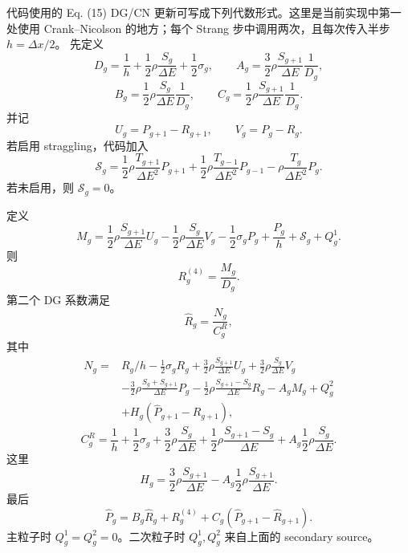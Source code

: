 \documentclass[11pt,a4paper]{ctexart}
\begin{document}
代码使用的 Eq. (15) DG/CN 更新可写成下列代数形式。这里是当前实现中第一处使用
Crank--Nicolson 的地方；每个 Strang 步中调用两次，且每次传入半步 \(h=\Delta x/2\)。
先定义
\begin{equation}
  D_g
  =
  \frac1h
  +\frac12\rho\frac{S_g}{\Delta E}
  +\frac12\sigma_g,
  \qquad
  A_g
  =
  \frac{3}{2}\rho\frac{S_{g+1}}{\Delta E}\frac{1}{D_g},
\end{equation}
\begin{equation}
  B_g
  =
  \frac12\rho\frac{S_g}{\Delta E}\frac{1}{D_g},
  \qquad
  C_g
  =
  \frac12\rho\frac{S_{g+1}}{\Delta E}\frac{1}{D_g}.
\end{equation}
并记
\begin{equation}
  U_g=P_{g+1}-R_{g+1},\qquad V_g=P_g-R_g.
\end{equation}
若启用 straggling，代码加入
\begin{equation}
  \mathcal S_g
  =
  \frac12\rho\frac{T_{g+1}}{\Delta E^2}P_{g+1}
  +
  \frac12\rho\frac{T_{g-1}}{\Delta E^2}P_{g-1}
  -
  \rho\frac{T_g}{\Delta E^2}P_g.
\end{equation}
若未启用，则 \(\mathcal S_g=0\)。

定义
\begin{equation}
  M_g
  =
  \frac12\rho\frac{S_{g+1}}{\Delta E}U_g
  -
  \frac12\rho\frac{S_g}{\Delta E}V_g
  -
  \frac12\sigma_g P_g
  +
  \frac{P_g}{h}
  +
  \mathcal S_g
  +
  Q_g^1.
\end{equation}
则
\begin{equation}
  R^{(4)}_g=\frac{M_g}{D_g}.
\end{equation}
第二个 DG 系数满足
\begin{equation}
  \widehat R_g=\frac{N_g}{C_g^{R}},
\end{equation}
其中
\begin{equation}
\begin{aligned}
  N_g={}&
    R_g/h-\frac12\sigma_gR_g
    +\frac32\rho\frac{S_{g+1}}{\Delta E}U_g
    +\frac32\rho\frac{S_g}{\Delta E}V_g \\
  &-\frac32\rho\frac{S_g+S_{g+1}}{\Delta E}P_g
    -\frac12\rho\frac{S_{g+1}-S_g}{\Delta E}R_g
    -A_gM_g+Q_g^2 \\
  &+H_g(\widehat P_{g+1}-\widehat R_{g+1}),
\end{aligned}
\end{equation}
\begin{equation}
  C_g^{R}
  =
  \frac1h+\frac12\sigma_g
  +\frac32\rho\frac{S_g}{\Delta E}
  +\frac12\rho\frac{S_{g+1}-S_g}{\Delta E}
  +A_g\frac12\rho\frac{S_g}{\Delta E}.
\end{equation}
这里
\begin{equation}
  H_g
  =
  \frac32\rho\frac{S_{g+1}}{\Delta E}
  -
  A_g\frac12\rho\frac{S_{g+1}}{\Delta E}.
\end{equation}
最后
\begin{equation}
  \widehat P_g
  =
  B_g\widehat R_g
  +
  R^{(4)}_g
  +
  C_g(\widehat P_{g+1}-\widehat R_{g+1}).
\end{equation}
主粒子时 \(Q_g^1=Q_g^2=0\)。二次粒子时 \(Q_g^1,Q_g^2\) 来自上面的 secondary source。
\end{document}
